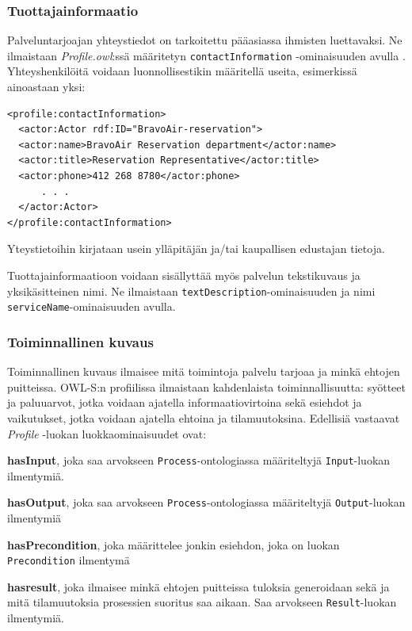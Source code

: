 \documentclass[finnish]{tktltiki2}
\theoremstyle{definition}
\theoremstyle{remark}
\begin{document}
\subsubsection{Tuottajainformaatio}

Palveluntarjoajan yhteystiedot on tarkoitettu pääasiassa ihmisten luettavaksi. Ne ilmaistaan \textit{Profile.owl}:ssä määritetyn \texttt{contactInformation} -ominaisuuden avulla \cite{OWLS}. Yhteyshenkilöitä voidaan luonnollisestikin määritellä useita, esimerkissä ainoastaan yksi\cite{daml}:  

\begin{verbatim}
<profile:contactInformation>
  <actor:Actor rdf:ID="BravoAir-reservation">
  <actor:name>BravoAir Reservation department</actor:name>
  <actor:title>Reservation Representative</actor:title>
  <actor:phone>412 268 8780</actor:phone>
      . . .
  </actor:Actor>
</profile:contactInformation>
\end{verbatim} 

Yteystietoihin kirjataan usein ylläpitäjän ja/tai kaupallisen edustajan tietoja. 

Tuottajainformaatioon voidaan sisällyttää myös palvelun tekstikuvaus ja yksikäsitteinen nimi\cite{OWLS}. Ne ilmaistaan \texttt{textDescription}-ominaisuuden ja nimi \texttt{serviceName}-ominaisuuden avulla.  


\subsubsection{Toiminnallinen kuvaus}

Toiminnallinen kuvaus ilmaisee mitä toimintoja palvelu tarjoaa ja minkä ehtojen puitteissa. OWL-S:n profiilissa ilmaistaan kahdenlaista toiminnallisuutta: syötteet ja paluuarvot, jotka voidaan ajatella informaatiovirtoina sekä esiehdot ja vaikutukset, jotka voidaan ajatella ehtoina ja tilamuutoksina. Edellisiä vastaavat \textit{Profile} -luokan luokkaominaisuudet ovat\cite{OWLS}:

\textbf{hasInput}, joka saa arvokseen \texttt{Process}-ontologiassa määriteltyjä \texttt{Input}-luokan ilmentymiä. 


\textbf{hasOutput}, joka saa arvokseen \texttt{Process}-ontologiassa määriteltyjä \texttt{Output}-luokan ilmentymiä


\textbf{hasPrecondition}, joka määrittelee jonkin esiehdon, joka on luokan \texttt{Precondition} ilmentymä


\textbf{hasresult}, joka ilmaisee minkä ehtojen puitteissa tuloksia generoidaan sekä ja mitä tilamuutoksia prosessien suoritus saa aikaan. Saa arvokseen \texttt{Result}-luokan ilmentymiä.  
\end{document}
